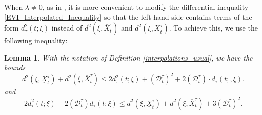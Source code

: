 \documentclass[11pt,a4paper]{amsart}
\newcommand{\1}{\mathds{1}}
\newtheorem{lemma}[theorem]{\textbf{Lemma}}
\numberwithin{equation}{section}
\begin{document}



When $\lambda \neq 0$, as in \cite{ambrosio2005gradient}, it is more convenient to modify the differential inequality \eqref{EVI_Interpolated_Inequality} so that the left-hand side contains terms of the form $d^2_{\tau}(t;\xi)$ instead of $d^2(\xi,\overline{X}^{\tau}_t)$ and $d^2(\xi,\underline{X}^{\tau}_t)$. To achieve this, we use the following inequality:

\begin{lemma} \label{replacement_bounds} With the notation of Definition \ref{interpolations_usual}, we have the bounds
\begin{equation} 
    d^2(\xi,\underline{X}_{t}^{\tau}) + d^2(\xi,\overline{X}^{\tau}_t) 
    \leq 2 d^2_{\tau}(t;\xi) + (\mathcal{D}_t^{\tau})^2 + 2(\mathcal{D}_t^{\tau})\cdot d_{\tau}(t;,\xi).  
    \label{upper_bound_on_d} 
\end{equation} 
and
\begin{equation}     \label{lower_bound_on_d}  
    2d^2_{\tau}(t;\xi) -2(\mathcal{D}_t^{\tau})d_{\tau}(t;\xi) \leq d^2(\xi,\underline{X}_t^{\tau}) + d^2(\xi,\overline{X}^{\tau}_t) + 3 (\mathcal{D}_t^{\tau})^2.\end{equation} 
\end{lemma}
\end{document}
